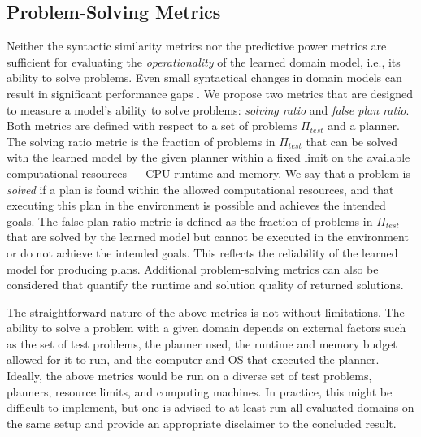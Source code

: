 \documentclass[letterpaper]{article} %
\newcommand{\ptest}{\ensuremath{\Pi_{\textit{test}}}\xspace}
\newif\ifaddcomments
\newcommand{\roni}[1]{\ifaddcomments{\textcolor{red}{[Roni: #1]}}\fi}
\newcommand{\mauro}[1]{\ifaddcomments{\textcolor{green}{[Mauro: #1]}}\fi}
\newcommand{\gregor}[1]{\ifaddcomments{\textcolor{orange}{[Gregor: #1]}}\fi}
\newcommand{\leo}[1]{\ifaddcomments{\textcolor{pink}{[Leonardo: #1]}}\fi}
\begin{document}
\subsection{Problem-Solving Metrics}
Neither the syntactic similarity metrics nor the predictive power metrics are sufficient for evaluating the \emph{operationality} \citep{DBLP:conf/kcap/McCluskeyVV17} of the learned domain model, i.e., its ability to solve problems. Even small syntactical changes in domain models can result in significant performance gaps \citep{DBLP:conf/kcap/VallatiC19,vallati2021importance}. 
We propose two metrics that are designed to measure a model's ability to solve problems: \emph{solving ratio} and \emph{false plan ratio}. 
Both metrics are defined with respect to a set of problems \ptest and a planner. 
The solving ratio metric is the fraction of problems in \ptest that can be solved with the learned model by the given planner within a fixed limit on the available computational resources --- CPU runtime and memory.
We say that a problem is \emph{solved} if a plan is found within the allowed computational resources, and that executing this plan in the environment is possible and achieves the intended goals.
The false-plan-ratio metric is defined as the fraction of problems in \ptest that are solved by the learned model but cannot be executed in the environment or do not achieve the intended goals. 
This reflects the reliability of the learned model for producing plans. 
Additional problem-solving metrics can also be considered that quantify the runtime and solution quality of returned solutions. 

The straightforward nature of the above metrics is not without limitations. The ability to solve a problem with a given domain depends on external factors such as the set of test problems, the planner used, the runtime and memory budget allowed for it to run, and the computer and OS that executed the planner. 
Ideally, the above metrics would be run on a diverse set of test problems, planners, resource limits, and computing machines. In practice, this might be difficult to implement, but one is advised to at least run all evaluated domains on the same setup and provide an appropriate disclaimer to the concluded result. 
\end{document}
